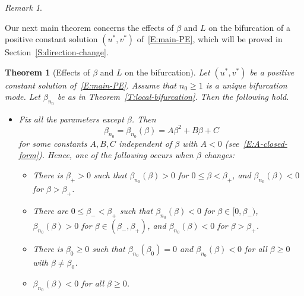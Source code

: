 \documentclass[11pt]{article} %
\newtheorem{theorem}{Theorem}[section] %
\theoremstyle{remark}
\newtheorem{remark}{Remark}[section]
\theoremstyle{remark}
\numberwithin{equation}{section}
\numberwithin{figure}{section}
\numberwithin{table}{section}
\begin{document}
\begin{remark}
\begin{itemize}
  \end{itemize}
\end{remark}


Our next main theorem concerns the effects of $\beta$ and $L$ on the bifurcation
of a positive constant solution $(u^*, v^*)$ of~\eqref{E:main-PE}, which will be
proved in Section~\ref{S:direction-change}.


\begin{theorem}[Effects of $\beta$ and $L$ on the bifurcation]\label{T:direction-change}
  Let $(u^*,v^*)$ be a positive constant solution of~\eqref{E:main-PE}. Assume
  that $n_0 \ge 1$ is a unique bifurcation mode. Let $\beta_{n_0}$ be as in
  Theorem~\ref{T:local-bifurcation}. Then the following hold.

  \begin{itemize}

    \item[(1)] Fix all the parameters except $\beta$. Then
      \begin{equation}\label{E:beta-n0-eq}
        \beta_{n_0}=\beta_{n_0}(\beta)=A\beta^2+B\beta+C
      \end{equation}
      for some constants $A, B, C$ independent of $\beta$ with $A < 0$
      (see~\eqref{E:A-closed-form}). Hence, one of the following occurs when
      $\beta$ changes:
      \begin{itemize}
        \item[(i)] There is $\beta_+ > 0$ such that $\beta_{n_0}(\beta) > 0$ for
          $0 \le \beta < \beta_+$, and $\beta_{n_0}(\beta) < 0$ for $\beta >
          \beta_+$.

        \item[(ii)] There are $0 \le \beta_- < \beta_+$ such that
          $\beta_{n_0}(\beta) < 0$ for $\beta \in [0, \beta_-)$,
          $\beta_{n_0}(\beta) > 0$ for $\beta \in (\beta_-, \beta_+)$, and
          $\beta_{n_0}(\beta) < 0$ for $\beta > \beta_+$.

        \item[(iii)] There is $\beta_0 \ge 0$ such that $\beta_{n_0}(\beta_0) =
          0$ and $\beta_{n_0}(\beta) < 0$ for all $\beta \ge 0$ with $\beta \ne \beta_0$.

        \item[(iv)]  $\beta_{n_0}(\beta) < 0$ for all $\beta \ge 0$.
      \end{itemize}


\end{itemize}
\end{theorem}
\end{document}
